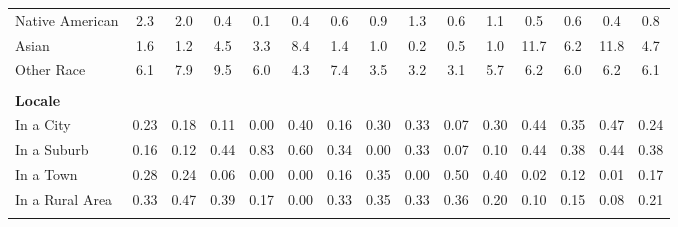 \begin{tabular*}{\linewidth}{@{\extracolsep{\fill} } lcccccccccccccc}
\hspace{0.2cm}Native American&2.3&2.0&0.4&0.1&0.4&0.6&0.9&1.3&0.6&1.1&0.5&0.6&0.4&0.8\\%
\hspace{0.2cm}Asian&1.6&1.2&4.5&3.3&8.4&1.4&1.0&0.2&0.5&1.0&11.7&6.2&11.8&4.7\\%
\hspace{0.2cm}Other Race&6.1&7.9&9.5&6.0&4.3&7.4&3.5&3.2&3.1&5.7&6.2&6.0&6.2&6.1\\%
&&&&&&&&&&&&&&\\%
\multicolumn{15}{l}{\bfseries Locale}\\%
\hspace{0.2cm}In a City&0.23&0.18&0.11&0.00&0.40&0.16&0.30&0.33&0.07&0.30&0.44&0.35&0.47&0.24\\%
\hspace{0.2cm}In a Suburb&0.16&0.12&0.44&0.83&0.60&0.34&0.00&0.33&0.07&0.10&0.44&0.38&0.44&0.38\\%
\hspace{0.2cm}In a Town&0.28&0.24&0.06&0.00&0.00&0.16&0.35&0.00&0.50&0.40&0.02&0.12&0.01&0.17\\%
\hspace{0.2cm}In a Rural Area&0.33&0.47&0.39&0.17&0.00&0.33&0.35&0.33&0.36&0.20&0.10&0.15&0.08&0.21\\%
&&&&&&&&&&&&&&\\%
\hline%
\end{tabular*}